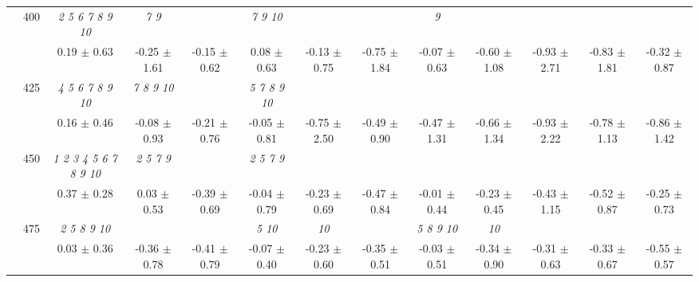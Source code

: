 \begin{table}[h]
{\begin{tabular}{
        ccccccccccccc}
 & \multirow{2}{*}{400}& \textit{  2  5  6  7  8  9 10 }& \textit{ 7 9 }& & \textit{  7  9 10 }& & & \textit{ 9 }& & & &  \\ 
 & & 0.19 $\pm$ 0.63& -0.25 $\pm$ 1.61& -0.15 $\pm$ 0.62& 0.08 $\pm$ 0.63& -0.13 $\pm$ 0.75& -0.75 $\pm$ 1.84& -0.07 $\pm$ 0.63& -0.60 $\pm$ 1.08& -0.93 $\pm$ 2.71& -0.83 $\pm$ 1.81& -0.32 $\pm$ 0.87 \\ 
 & \multirow{2}{*}{425}& \cellcolor[HTML]{EFEFEF} \textit{  4  5  6  7  8  9 10 }& \cellcolor[HTML]{EFEFEF} \textit{  7  8  9 10 }& \cellcolor[HTML]{EFEFEF} & \cellcolor[HTML]{EFEFEF} \textit{  5  7  8  9 10 }& \cellcolor[HTML]{EFEFEF} & \cellcolor[HTML]{EFEFEF} & \cellcolor[HTML]{EFEFEF} & \cellcolor[HTML]{EFEFEF} & \cellcolor[HTML]{EFEFEF} & \cellcolor[HTML]{EFEFEF} & \cellcolor[HTML]{EFEFEF}  \\ 
 & & \cellcolor[HTML]{EFEFEF} 0.16 $\pm$ 0.46& \cellcolor[HTML]{EFEFEF} -0.08 $\pm$ 0.93& \cellcolor[HTML]{EFEFEF} -0.21 $\pm$ 0.76& \cellcolor[HTML]{EFEFEF} -0.05 $\pm$ 0.81& \cellcolor[HTML]{EFEFEF} -0.75 $\pm$ 2.50& \cellcolor[HTML]{EFEFEF} -0.49 $\pm$ 0.90& \cellcolor[HTML]{EFEFEF} -0.47 $\pm$ 1.31& \cellcolor[HTML]{EFEFEF} -0.66 $\pm$ 1.34& \cellcolor[HTML]{EFEFEF} -0.93 $\pm$ 2.22& \cellcolor[HTML]{EFEFEF} -0.78 $\pm$ 1.13& \cellcolor[HTML]{EFEFEF} -0.86 $\pm$ 1.42 \\ 
 & \multirow{2}{*}{450}& \textit{  1  2  3  4  5  6  7  8  9 10 }& \textit{ 2 5 7 9 }& & \textit{ 2 5 7 9 }& & & & & & &  \\ 
 & & 0.37 $\pm$ 0.28& 0.03 $\pm$ 0.53& -0.39 $\pm$ 0.69& -0.04 $\pm$ 0.79& -0.23 $\pm$ 0.69& -0.47 $\pm$ 0.84& -0.01 $\pm$ 0.44& -0.23 $\pm$ 0.45& -0.43 $\pm$ 1.15& -0.52 $\pm$ 0.87& -0.25 $\pm$ 0.73 \\ 
 & \multirow{2}{*}{475}& \cellcolor[HTML]{EFEFEF} \textit{  2  5  8  9 10 }& \cellcolor[HTML]{EFEFEF} & \cellcolor[HTML]{EFEFEF} & \cellcolor[HTML]{EFEFEF} \textit{  5 10 }& \cellcolor[HTML]{EFEFEF} \textit{ 10 }& \cellcolor[HTML]{EFEFEF} & \cellcolor[HTML]{EFEFEF} \textit{  5  8  9 10 }& \cellcolor[HTML]{EFEFEF} \textit{ 10 }& \cellcolor[HTML]{EFEFEF} & \cellcolor[HTML]{EFEFEF} & \cellcolor[HTML]{EFEFEF}  \\ 
 & & \cellcolor[HTML]{EFEFEF} 0.03 $\pm$ 0.36& \cellcolor[HTML]{EFEFEF} -0.36 $\pm$ 0.78& \cellcolor[HTML]{EFEFEF} -0.41 $\pm$ 0.79& \cellcolor[HTML]{EFEFEF} -0.07 $\pm$ 0.40& \cellcolor[HTML]{EFEFEF} -0.23 $\pm$ 0.60& \cellcolor[HTML]{EFEFEF} -0.35 $\pm$ 0.51& \cellcolor[HTML]{EFEFEF} -0.03 $\pm$ 0.51& \cellcolor[HTML]{EFEFEF} -0.34 $\pm$ 0.90& \cellcolor[HTML]{EFEFEF} -0.31 $\pm$ 0.63& \cellcolor[HTML]{EFEFEF} -0.33 $\pm$ 0.67& \cellcolor[HTML]{EFEFEF} -0.55 $\pm$ 0.57 \\ 

\end{tabular}}
\end{table}
